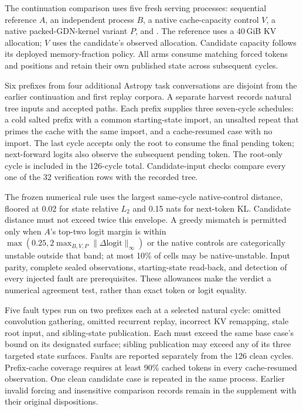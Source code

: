 The continuation comparison uses five fresh serving processes: sequential reference $A$, an independent process $B$, a native cache-capacity control $V$, a native packed-GDN-kernel variant $P$, and \sys{}. The reference uses a 40\,GiB KV allocation; $V$ uses the candidate's observed allocation. Candidate capacity follows its deployed memory-fraction policy. All arms consume matching forced tokens and positions and retain their own published state across subsequent cycles.

Six prefixes from four additional Astropy task conversations are disjoint from the earlier continuation and first replay corpora. A separate harvest records natural tree inputs and accepted paths. Each prefix supplies three seven-cycle schedules: a cold salted prefix with a common starting-state import, an unsalted repeat that primes the cache with the same import, and a cache-resumed case with no import. The last cycle accepts only the root to consume the final pending token; next-forward logits also observe the subsequent pending token. The root-only cycle is included in the 126-cycle total. Candidate-input checks compare every one of the 32 verification rows with the recorded tree.

The frozen numerical rule uses the largest same-cycle native-control distance, floored at 0.02 for state relative $L_2$ and 0.15 nats for next-token KL. Candidate distance must not exceed twice this envelope. A greedy mismatch is permitted only when $A$'s top-two logit margin is within $\max(0.25,2\max_{B,V,P}\|\Delta\mathrm{logit}\|_\infty)$ or the native controls are categorically unstable outside that band; at most 10\% of cells may be native-unstable. Input parity, complete sealed observations, starting-state read-back, and detection of every injected fault are prerequisites. These allowances make the verdict a numerical agreement test, rather than exact token or logit equality.

Five fault types run on two prefixes each at a selected natural cycle: omitted convolution gathering, omitted recurrent replay, incorrect KV remapping, stale root input, and sibling-state publication. Each must exceed the same base case's bound on its designated surface; sibling publication may exceed any of its three targeted state surfaces. Faults are reported separately from the 126 clean cycles. Prefix-cache coverage requires at least 90\% cached tokens in every cache-resumed observation. One clean candidate case is repeated in the same process. Earlier invalid forcing and insensitive comparison records remain in the supplement with their original dispositions.

